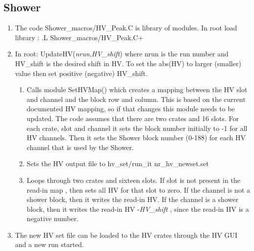 \documentclass[]{article}
\begin{document}
\subsection{Shower}
\begin{enumerate} 
	\item The code Shower\_macros/HV\_Peak.C is library of modules. In root load library : .L Shower\_macros/HV\_Peak.C+
	\item In root: UpdateHV({\it nrun},{\it HV\_shift}) where nrun is the run number and HV\_shift is the desired shift in HV. To set the abs(HV) to larger (smaller) value then set positive (negative) HV\_shift.
	\begin{enumerate}
		\item Calls module SetHVMap() which creates a mapping between the HV slot and channel and the block row and column. This is based on the current documented HV mapping, so if that changes this module needs to be updated. The code assumes that there are two crates and 16 slots. For each crate, slot and channel it sets the block number initially to -1 for all HV channels. Then it sets the Shower block number (0-188) for each HV channel that is used by the Shower.
		\item Sets the HV output file to hv\_set/run\_{it nr}\_hv\_newset.set
		\item Loops through two crates and sixteen slots. If slot is not present in the read-in map , then sets all HV for that slot to zero. If the channel is not a shower block, then it writes the read-in HV. If the channel is a shower block, then it writes the read-in HV -{\it HV\_shift} , since the read-in HV is a negative number.
	\end{enumerate}
		\item The new HV set file can be loaded to the HV crates through the HV GUI and a new run started. 
\end{enumerate}
\end{document}
